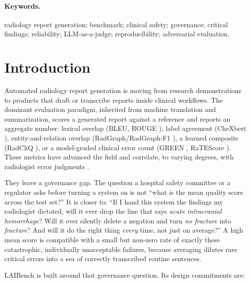 \documentclass[11pt]{article}
\begin{document}
\paragraph{Keywords.} radiology report generation; benchmark; clinical safety;
governance; critical findings; reliability; LLM-as-a-judge; reproducibility;
adversarial evaluation.

\section{Introduction}

Automated radiology report generation is moving from research demonstrations to
products that draft or transcribe reports inside clinical workflows. The
dominant evaluation paradigm, inherited from machine translation and
summarization, scores a generated report against a reference and reports an
aggregate number: lexical overlap (BLEU, ROUGE \cite{Papineni2002BLEU,
Lin2004ROUGE}), label agreement (CheXbert \cite{Smit2020CheXbert,
Irvin2019CheXpert}), entity-and-relation overlap (RadGraph/RadGraph-F1
\cite{Jain2021RadGraph}), a learned composite (RadCliQ \cite{Yu2023RadCliQ}), or
a model-graded clinical error count (GREEN \cite{Ostmeier2024GREEN}, RaTEScore
\cite{Zhao2024RaTEScore}). These metrics have advanced the field and correlate,
to varying degrees, with radiologist error judgments \cite{Yu2023ReXVal}.

They leave a governance gap. The question a hospital safety committee or a
regulator asks before turning a system on is not ``what is the mean quality
score across the test set?'' It is closer to: ``If I hand this system the
findings my radiologist dictated, will it ever drop the line that says
\emph{acute intracranial hemorrhage}? Will it ever silently delete a negation
and turn \emph{no fracture} into \emph{fracture}? And will it do the right thing
\emph{every} time, not just on average?'' A high mean score is compatible with a
small but non-zero rate of exactly these catastrophic, individually
unacceptable failures, because averaging dilutes rare critical errors into a
sea of correctly transcribed routine sentences.

LAIBench is built around that governance question. Its design commitments are:
\end{document}
